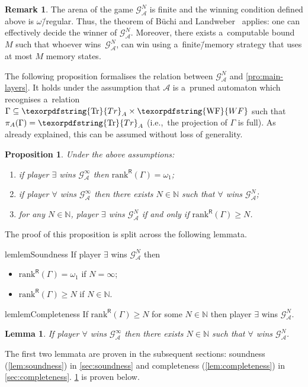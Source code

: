 \documentclass[11pt,a4paper]{amsart}
\theoremstyle{plain}
\newtheorem{lem}[thm]{Lemma}
\newtheorem{prop}[thm]{Proposition}
\theoremstyle{definition}
\newtheorem{rem}[thm]{Remark}
\theoremstyle{defC}
\theoremstyle{thmC}
\theoremstyle{plain}
\numberwithin{equation}{section}
\numberwithin{equation}{section}
\numberwithin{figure}{section}
\newcommand{\ident}[1]{\ensuremath{\texorpdfstring{\mathrm{\mathnm{#1}}}{#1}}\xspace}
\newcommand{\domain}[1]{\ensuremath{\mathbb{#1}}\xspace}
\newcommand{\N}{\domain{N}}
\newcommand{\mathcalsym}[1]{\ensuremath{\mathcal{#1}}\xspace}
\newcommand{\CA}{\mathcalsym{A}}
\newcommand{\CG}{\mathcalsym{G}}
\newcommand{\mathnm}[1]{#1}
\newcommand{\trees}{\ident{Tr}}
\newcommand{\WF}{\ident{WF}}
\newcommand{\sR}{\mathsf{R}}
\newcommand{\eve}{\ensuremath{\exists}\xspace}
\newcommand{\adam}{\ensuremath{\forall}\xspace}
\newcommand{\limitF}{\mathrm{rank}^{\sR}}
\begin{document}
\begin{rem}
\label{rem:decide-winner}
	The arena of the game $\CG^N_\CA$ is finite and the winning condition defined above is $\omega$\=/regular.
	Thus, the theorem of Büchi and Landweber~\cite{buchi_synthesis} applies: one can effectively decide the winner of $\CG^N_\CA$.
	Moreover, there exists a~computable bound $M$ such that whoever wins~$\CG^N_\CA$, can win using a~finite\=/memory strategy that uses at most $M$ memory states.
\end{rem}

The following proposition formalises the relation between $\CG^N_\CA$ and \cref{pro:main-layers}.
It holds under the assumption that $\CA$ is a~pruned automaton which recognises a~relation $\Gamma\subseteq\trees_A\times\WF$ such that $\pi_A(\Gamma)=\trees_A$ (i.e.,~the projection of $\Gamma$ is full).
As already explained, this can be assumed without loss of generality.

\begin{prop}
	Under the above assumptions:
	\begin{enumerate}
	\item if player \eve wins $\CG^\infty_\CA$ then $\limitF(\Gamma)=\omega_1$;
	\item if player \adam wins $\CG^\infty_\CA$ then there exists $N\in\N$ such that \adam wins $\CG^N_\CA$;
	\item for any $N\in\N$, player \eve wins $\CG^N_\CA$ if and only if $\limitF(\Gamma)\geq N$.
	\end{enumerate}
\end{prop}
\noindent %
The proof of this proposition is split across the following lemmata.

\begin{restatable}{lem}{lemSoundness}
\label{lem:soundness}
	If player \eve wins $\CG^N_\CA$ then
	\begin{itemize}
		\item $\limitF(\Gamma)=\omega_1$ if $N=\infty$;
		\item $\limitF(\Gamma)\geq N$ if $N\in\N$.
	\end{itemize}
\end{restatable}

\begin{restatable}{lem}{lemCompleteness}
\label{lem:completeness}
	If $\limitF(\Gamma)\geq N$ for some $N\in\N$ then player \eve wins $\CG^N_\CA$.
\end{restatable}

\begin{lem}\label{lem:finitary}
	If player \adam wins $\CG^\infty_\CA$ then there exists $N\in\N$ such that \adam wins $\CG^N_\CA$.
\end{lem}
\noindent %
The first two lemmata are proven in the subsequent sections: soundness (\cref{lem:soundness}) in \cref{sec:soundness}
and completeness (\cref{lem:completeness}) in \cref{sec:completeness}. \cref{lem:finitary} is proven below.
\end{document}
